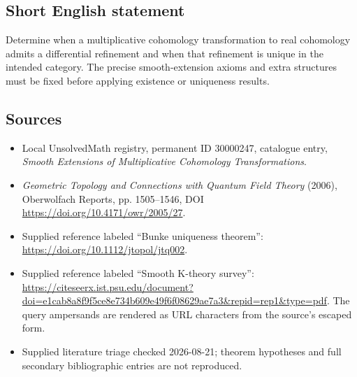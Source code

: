 \documentclass[11pt]{article}
\begin{document}
\subsection{Short English statement}
Determine when a multiplicative cohomology transformation to real cohomology admits a differential refinement and when that refinement is unique in the intended category. The precise smooth-extension axioms and extra structures must be fixed before applying existence or uniqueness results.
\subsection{Sources}
\begin{itemize}
\item Local UnsolvedMath registry, permanent ID 30000247, catalogue entry, \emph{Smooth Extensions of Multiplicative Cohomology Transformations}.
\item \emph{Geometric Topology and Connections with Quantum Field Theory} (2006), Oberwolfach Reports, pp. 1505--1546, DOI \url{https://doi.org/10.4171/owr/2005/27}.
\item Supplied reference labeled ``Bunke uniqueness theorem'': \url{https://doi.org/10.1112/jtopol/jtq002}.
\item Supplied reference labeled ``Smooth K-theory survey'': \url{https://citeseerx.ist.psu.edu/document?doi=e1cab8a8f9f5ce8e734b609e49f6f08629ae7a3&repid=rep1&type=pdf}. The query ampersands are rendered as URL characters from the source's escaped form.
\item Supplied literature triage checked 2026-08-21; theorem hypotheses and full secondary bibliographic entries are not reproduced.
\end{itemize}
\end{document}

